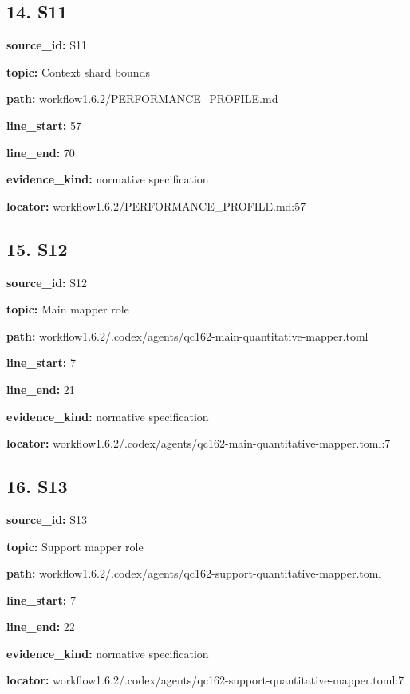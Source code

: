 \documentclass[10pt,a4paper]{article}
\begin{document}
\subsection*{14.\allowbreak{} S11}
\textbf{source\_\allowbreak{}id:} S11\par
\textbf{topic:} Context shard bounds\par
\textbf{path:} workflow1.\allowbreak{}6.\allowbreak{}2/\allowbreak{}PERFORMANCE\_\allowbreak{}PROFILE.\allowbreak{}md\par
\textbf{line\_\allowbreak{}start:} 57\par
\textbf{line\_\allowbreak{}end:} 70\par
\textbf{evidence\_\allowbreak{}kind:} normative specification\par
\textbf{locator:} workflow1.\allowbreak{}6.\allowbreak{}2/\allowbreak{}PERFORMANCE\_\allowbreak{}PROFILE.\allowbreak{}md:57\par
\subsection*{15.\allowbreak{} S12}
\textbf{source\_\allowbreak{}id:} S12\par
\textbf{topic:} Main mapper role\par
\textbf{path:} workflow1.\allowbreak{}6.\allowbreak{}2/\allowbreak{}.\allowbreak{}codex/\allowbreak{}agents/\allowbreak{}qc162-\allowbreak{}main-\allowbreak{}quantitative-\allowbreak{}mapper.\allowbreak{}toml\par
\textbf{line\_\allowbreak{}start:} 7\par
\textbf{line\_\allowbreak{}end:} 21\par
\textbf{evidence\_\allowbreak{}kind:} normative specification\par
\textbf{locator:} workflow1.\allowbreak{}6.\allowbreak{}2/\allowbreak{}.\allowbreak{}codex/\allowbreak{}agents/\allowbreak{}qc162-\allowbreak{}main-\allowbreak{}quantitative-\allowbreak{}mapper.\allowbreak{}toml:7\par
\subsection*{16.\allowbreak{} S13}
\textbf{source\_\allowbreak{}id:} S13\par
\textbf{topic:} Support mapper role\par
\textbf{path:} workflow1.\allowbreak{}6.\allowbreak{}2/\allowbreak{}.\allowbreak{}codex/\allowbreak{}agents/\allowbreak{}qc162-\allowbreak{}support-\allowbreak{}quantitative-\allowbreak{}mapper.\allowbreak{}toml\par
\textbf{line\_\allowbreak{}start:} 7\par
\textbf{line\_\allowbreak{}end:} 22\par
\textbf{evidence\_\allowbreak{}kind:} normative specification\par
\textbf{locator:} workflow1.\allowbreak{}6.\allowbreak{}2/\allowbreak{}.\allowbreak{}codex/\allowbreak{}agents/\allowbreak{}qc162-\allowbreak{}support-\allowbreak{}quantitative-\allowbreak{}mapper.\allowbreak{}toml:7\par
\end{document}

